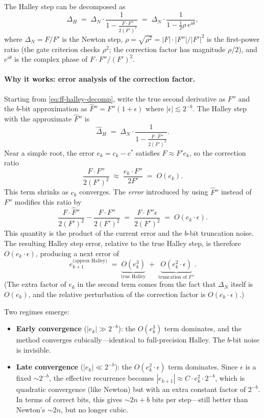 The Halley step can be decomposed as
\begin{equation}\label{eq:ff-halley-decomp}
\Delta_H \;=\; \Delta_N \cdot \frac{1}{1 - \frac{F \cdot F''}{2(F')^2}}
\;=\; \Delta_N \cdot \frac{1}{1 - \tfrac{1}{2}\rho\, e^{i\theta}},
\end{equation}
where $\Delta_N = F/F'$ is the Newton step, $\rho = \sqrt{\rho^2} =
|F|\cdot|F''|/|F'|^2$ is the first-power ratio (the gate criterion checks
$\rho^2$; the correction factor has magnitude $\rho/2$), and $e^{i\theta}$
is the complex phase of $F \cdot F'' / (F')^2$.

\paragraph{Why it works: error analysis of the correction factor.}
Starting from \eqref{eq:ff-halley-decomp}, write the true second derivative as $F''$ and the $b$-bit approximation as
$\hat{F}'' = F''(1 + \epsilon)$ where $|\epsilon| \lesssim 2^{-b}$.  The
Halley step with the approximate $\hat{F}''$ is
\[
\hat{\Delta}_H \;=\; \Delta_N \cdot
  \frac{1}{1 - \frac{F \cdot \hat{F}''}{2(F')^2}}.
\]
Near a simple root, the error $e_k = c_k - c^*$ satisfies $F \approx F' e_k$,
so the correction ratio
\[
\frac{F \cdot F''}{2(F')^2} \;\approx\;
  \frac{e_k \cdot F''}{2 F'} \;=\; O(e_k).
\]
This term shrinks as $c_k$ converges.  The \emph{error} introduced by using
$\hat{F}''$ instead of $F''$ modifies this ratio by
\[
\frac{F \cdot \hat{F}''}{2(F')^2}
  - \frac{F \cdot F''}{2(F')^2}
  \;=\; \frac{F \cdot F'' \epsilon}{2(F')^2}
  \;=\; O(e_k \cdot \epsilon).
\]
This quantity is the product of the current error and the $b$-bit truncation noise.
The resulting Halley step error, relative to the true Halley step, is therefore
$O(e_k \cdot \epsilon)$, producing a next error of
\[
e_{k+1}^{\text{(approx Halley)}} \;=\;
  \underbrace{O(e_k^3)}_{\text{true Halley}}
  \;+\;
  \underbrace{O(e_k^2 \cdot \epsilon)}_{\text{truncation of } F''}.
\]
(The extra factor of $e_k$ in the second term comes from the fact that
$\Delta_N$ itself is $O(e_k)$, and the relative perturbation of the
correction factor is $O(e_k \cdot \epsilon)$.)

Two regimes emerge:
\begin{itemize}
\item \textbf{Early convergence} ($|e_k| \gg 2^{-b}$): the $O(e_k^3)$ term
  dominates, and the method converges cubically---identical to full-precision
  Halley.  The $b$-bit noise is invisible.
\item \textbf{Late convergence} ($|e_k| \ll 2^{-b}$): the
  $O(e_k^2 \cdot \epsilon)$ term dominates.  Since $\epsilon$ is a fixed
  ${\sim}2^{-b}$, the effective recurrence becomes $|e_{k+1}| \approx
  C \cdot e_k^2 \cdot 2^{-b}$, which is quadratic convergence (like Newton)
  but with an extra constant factor of $2^{-b}$.  In terms of correct bits,
  this gives ${\sim}2n + b$ bits per step---still better than Newton's
  ${\sim}2n$, but no longer cubic.
\end{itemize}


